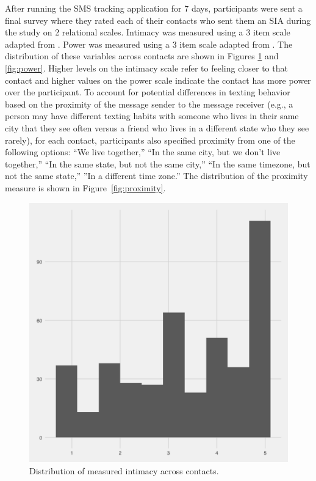 \documentclass[12pt]{nuthesis}	%
\begin{document}
After running the SMS tracking application for 7 days, participants were sent a final survey where they rated each of their contacts who sent them an SIA during the study on 2 relational scales. Intimacy was measured using a 3 item scale adapted from \citet{miller1982assessment}. Power was measured using a 3 item scale adapted from \citet{farrell2015relationship}. The distribution of these variables across contacts are shown in Figures \ref{fig:intimacy} and \ref{fig:power}. Higher levels on the intimacy scale refer to feeling closer to that contact and higher values on the power scale indicate the contact has more power over the participant.  To account for potential differences in texting behavior based on the proximity of the message sender to the message receiver (e.g., a person may have different texting habits with someone who lives in their same city that they see often versus a friend who lives in a different state who they see rarely), for each contact, participants also specified proximity from one of the following options: ``We live together,'' ``In the same city, but we don't live together,'' ``In the same state, but not the same city,'' ``In the same timezone, but not the same state,'' ''In a different time zone.'' The distribution of the proximity measure is shown in Figure~\ref{fig:proximity}.


\begin{figure}[h]
\centering
\includegraphics[width=.7\textwidth]{figures/intimacy_distribution}
\caption{Distribution of measured intimacy across contacts.}
\label{fig:intimacy}
\end{figure}
\end{document}
